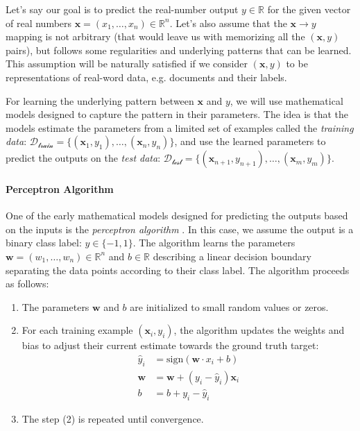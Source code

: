 Let's say our goal is to predict the real-number output $y \in \mathbb{R}$ for the given vector of real numbers $\mathbf{x} = (x_1, \ldots, x_n) \in \mathbb{R}^n$.
Let's also assume that the $\mathbf{x} \rightarrow y$ mapping is not arbitrary (that would leave us with memorizing all the $(\mathbf{x},y)$ pairs), but follows some regularities and underlying patterns that can be learned. This assumption will be naturally satisfied if we consider $(\mathbf{x},y)$ to be representations of real-word data, e.g. documents and their labels.

For learning the underlying pattern between $\mathbf{x}$ and $y$, we will use mathematical models designed to capture the pattern in their parameters. The idea is that the models estimate the parameters from a limited set of examples called the \textit{training data}:  $\mathcal{D_{\text{train}}} = \{(\mathbf{x}_1, y_1), \ldots, (\mathbf{x}_{n}, y_{n})\}$, and use the learned parameters to predict the outputs on the \textit{test data}: $\mathcal{D_{\text{test}}} = \{(\mathbf{x}_{n+1}, y_{n+1}), \ldots, (\mathbf{x}_{m}, y_{m})\}$.

\paragraph{Perceptron Algorithm} One of the early mathematical models designed for predicting the outputs based on the inputs is the \emph{perceptron algorithm} \cite{rosenblatt1958perceptron}. In this case, we assume the output is a binary class label: $y \in \{-1, 1\}$. The algorithm learns the parameters $\textbf{w} = (w_1, \ldots, w_n) \in \mathbb{R}^n$ and $b \in \mathbb{R}$ describing a linear decision boundary separating the data points according to their class label. The algorithm proceeds as follows:


\begin{enumerate}
    \item The parameters $\textbf{w}$ and $b$ are initialized to small random values or zeros.
    \item For each training example $(\mathbf{x}_i, y_i)$, the algorithm updates the weights and bias to adjust their current estimate towards the ground truth target:
          \begin{align} \label{eq:perceptron1}
              \hat{y}_i  & = \text{sign}(\textbf{w} \cdot x_i + b)       \\
              \textbf{w} & = \textbf{w} + (y_i - \hat{y}_i) \textbf{x}_i \\
              b          & = b + y_i - \hat{y}_i
          \end{align}
    \item The step (2) is repeated until convergence.
\end{enumerate}

